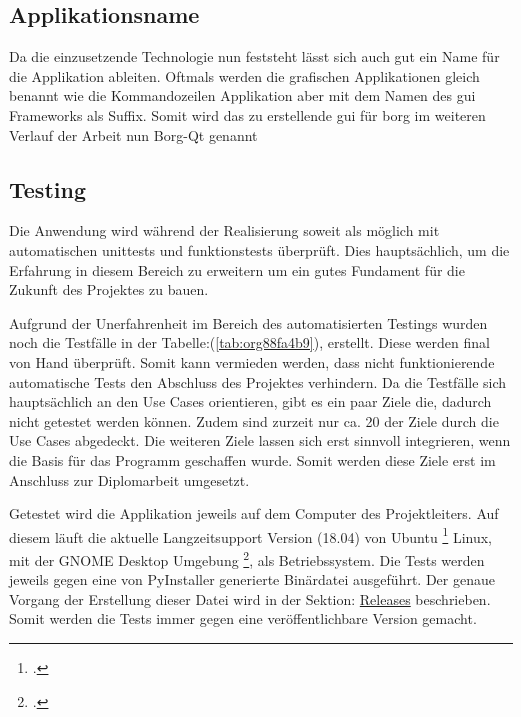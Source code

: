 \subsection{Applikationsname}
\label{sec:orgef6c2a4}

Da die einzusetzende Technologie nun feststeht lässt sich auch gut ein Name für
die Applikation ableiten. Oftmals werden die grafischen Applikationen gleich
benannt wie die Kommandozeilen Applikation aber mit dem Namen des \gls{gui}
Frameworks als Suffix. Somit wird das zu erstellende \gls{gui} für \gls{borg} im
weiteren Verlauf der Arbeit nun Borg-Qt genannt
\newpage
\subsection{Testing}
\label{sec:orge549d43}

Die Anwendung wird während der Realisierung soweit als möglich mit
automatischen \glspl{unittest} und \glspl{funktionstest} überprüft. Dies
hauptsächlich, um die Erfahrung in diesem Bereich zu erweitern um ein gutes
Fundament für die Zukunft des Projektes zu bauen.

Aufgrund der Unerfahrenheit im Bereich des automatisierten Testings wurden noch
die Testfälle in der Tabelle:(\ref{tab:org88fa4b9}), erstellt. Diese werden final von
Hand überprüft. Somit kann vermieden werden, dass nicht funktionierende
automatische Tests den Abschluss des Projektes verhindern. Da die Testfälle
sich hauptsächlich an den Use Cases orientieren, gibt es ein paar Ziele die,
dadurch nicht getestet werden können. Zudem sind zurzeit nur ca. 20 der Ziele
durch die Use Cases abgedeckt. Die weiteren Ziele lassen sich erst sinnvoll
integrieren, wenn die Basis für das Programm geschaffen wurde. Somit werden
diese Ziele erst im Anschluss zur Diplomarbeit umgesetzt.

Getestet wird die Applikation jeweils auf dem Computer des Projektleiters. Auf
diesem läuft die aktuelle Langzeitsupport Version (18.04) von Ubuntu
\footcite{ubuntu} Linux, mit der GNOME Desktop Umgebung \footcite{gnome}, als
Betriebssystem. Die Tests werden jeweils gegen eine von PyInstaller generierte
Binärdatei ausgeführt. Der genaue Vorgang der Erstellung dieser Datei wird in
der Sektion: \hyperref[sec:org3adb3b3]{Releases} beschrieben. Somit werden die Tests immer gegen eine
veröffentlichbare Version gemacht.


